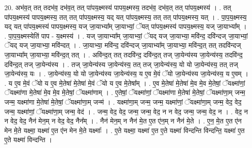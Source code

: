 \documentclass[17pt]{extarticle}
\begin{document}
20. अभ॑व॒त् तत् तदभ॑व॒ दभ॑व॒त् तत् पा॑पय॒क्ष्मस्य॑ पापय॒क्ष्मस्य॒ तदभ॑व॒ दभ॑व॒त् तत् पा॑पय॒क्ष्मस्य॑ । . तत् पा॑पय॒क्ष्मस्य॑ पापय॒क्ष्मस्य॒ तत् तत् पा॑पय॒क्ष्मस्य॒ यद् यत् पा॑पय॒क्ष्मस्य॒ तत् तत् पा॑पय॒क्ष्मस्य॒ यत् । . पा॒प॒य॒क्ष्मस्य॒ यद् यत् पा॑पय॒क्ष्मस्य॑ पापय॒क्ष्मस्य॒ यज् जा॒याभ्या᳚म् जा॒याभ्यां॒ ॅयत् पा॑पय॒क्ष्मस्य॑ पापय॒क्ष्मस्य॒ यज् जा॒याभ्या᳚म् । . पा॒प॒य॒क्ष्मस्येति॑ पाप - य॒क्ष्मस्य॑ । . यज् जा॒याभ्या᳚म् जा॒याभ्यां॒ ॅयद् यज् जा॒याभ्या॒ मवि॑न्द॒ दवि॑न्दज् जा॒याभ्यां॒ ॅयद् यज् जा॒याभ्या॒ मवि॑न्दत् । . जा॒याभ्या॒ मवि॑न्द॒ दवि॑न्दज् जा॒याभ्या᳚म् जा॒याभ्या॒ मवि॑न्द॒त् तत् तदवि॑न्दज् जा॒याभ्या᳚म् जा॒याभ्या॒ मवि॑न्द॒त् तत् । . अवि॑न्द॒त् तत् तदवि॑न्द॒ दवि॑न्द॒त् तज् जा॒येन्य॑स्य जा॒येन्य॑स्य॒ तदवि॑न्द॒ दवि॑न्द॒त् तज् जा॒येन्य॑स्य । . तज् जा॒येन्य॑स्य जा॒येन्य॑स्य॒ तत् तज् जा॒येन्य॑स्य॒ यो यो जा॒येन्य॑स्य॒ तत् तज् जा॒येन्य॑स्य॒ यः । . जा॒येन्य॑स्य॒ यो यो जा॒येन्य॑स्य जा॒येन्य॑स्य॒ य ए॒व मे॒वं ॅयो जा॒येन्य॑स्य जा॒येन्य॑स्य॒ य ए॒वम् । . य ए॒व मे॒वं ॅयो य ए॒व मे॒तेषा॑ मे॒तेषा॑ मे॒वं ॅयो य ए॒व मे॒तेषा᳚म् । . ए॒व मे॒तेषा॑ मे॒तेषा॑ मे॒व मे॒व मे॒तेषां॒ ॅयक्ष्मा॑णां॒ ॅयक्ष्मा॑णा मे॒तेषा॑ मे॒व मे॒व मे॒तेषां॒ ॅयक्ष्मा॑णाम् । . ए॒तेषां॒ ॅयक्ष्मा॑णां॒ ॅयक्ष्मा॑णा मे॒तेषा॑ मे॒तेषां॒ ॅयक्ष्मा॑णा॒म् जन्म॒ जन्म॒ यक्ष्मा॑णा मे॒तेषा॑ मे॒तेषां॒ ॅयक्ष्मा॑णा॒म् जन्म॑ । . यक्ष्मा॑णा॒म् जन्म॒ जन्म॒ यक्ष्मा॑णां॒ ॅयक्ष्मा॑णा॒म् जन्म॒ वेद॒ वेद॒ जन्म॒ यक्ष्मा॑णां॒ ॅयक्ष्मा॑णा॒म् जन्म॒ वेद॑ । . जन्म॒ वेद॒ वेद॒ जन्म॒ जन्म॒ वेद॒ न न वेद॒ जन्म॒ जन्म॒ वेद॒ न । . वेद॒ न न वेद॒ वेद॒ नैन॑ मेन॒म् न वेद॒ वेद॒ नैन᳚म् । . नैन॑ मेन॒म् न नैन॑ मे॒त ए॒त ए॑न॒म् न नैन॑ मे॒ते । . ए॒न॒ मे॒त ए॒त ए॑न मेन मे॒ते यक्ष्मा॒ यक्ष्मा॑ ए॒त ए॑न मेन मे॒ते यक्ष्माः᳚ । . ए॒ते यक्ष्मा॒ यक्ष्मा॑ ए॒त ए॒ते यक्ष्मा॑ विन्दन्ति विन्दन्ति॒ यक्ष्मा॑ ए॒त ए॒ते यक्ष्मा॑ विन्दन्ति । \newline
\end{document}
